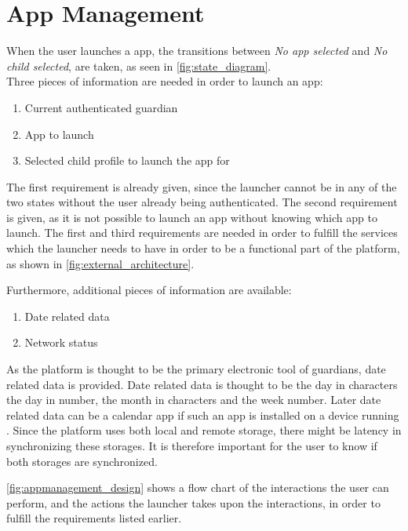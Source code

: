 \section{App Management}
\label{sec:app_management}
\label{sec:appman_solution}
\label{sec:appman_requirements}

When the user launches a \giraf[] app, the transitions between \emph{No app selected} and \emph{No child selected}, are taken, as seen in \autoref{fig:state_diagram}.\\

\noindent Three pieces of information are needed in order to launch an app:

\begin{enumerate}
	\item Current authenticated guardian
	\item App to launch
	\item Selected child profile to launch the app for
\end{enumerate}

The first requirement is already given, since the launcher cannot be in any of the two states without the user already being authenticated.
The second requirement is given, as it is not possible to launch an app without knowing which app to launch.
The first and third requirements are needed in order to fulfill the services which the launcher needs to have in order to be a functional part of the \giraf[] platform, as shown in \autoref{fig:external_architecture}.

Furthermore, additional pieces of information are available:

\begin{enumerate}
	\item Date related data
	\item Network status 
\end{enumerate}

As the \giraf[] platform is thought to be the primary electronic tool of guardians, date related data is provided. Date related data is thought to be the day in characters the day in number, the month in characters and the week number. Later date related data can be a calendar app if such an app is installed on a device running \giraf[].
Since the \giraf[] platform uses both local and remote storage, there might be latency in synchronizing these storages.
It is therefore important for the user to know if both storages are synchronized.

\autoref{fig:appmanagement_design} shows a flow chart of the interactions the user can perform, and the actions the launcher takes upon the interactions, in order to fulfill the requirements listed earlier.

